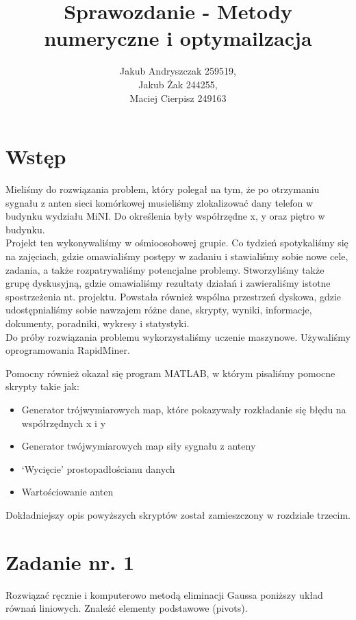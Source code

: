 \documentclass{article}
\begin{document}
\title{Sprawozdanie - Metody numeryczne i optymailzacja}
\author{Jakub Andryszczak 259519,\\ Jakub Żak 244255,\\ Maciej Cierpisz 249163}
\date{}
\maketitle
\tableofcontents
\newpage
\section{Wstęp}
Mieliśmy do rozwiązania problem, który polegał na tym, że po otrzymaniu sygnału z anten sieci komórkowej musieliśmy zlokalizować dany telefon w budynku wydziału MiNI. Do określenia były współrzędne x, y oraz piętro w budynku.\\

Projekt ten wykonywaliśmy w ośmioosobowej grupie. Co tydzień spotykaliśmy się na zajęciach, gdzie omawialiśmy postępy w zadaniu i stawialiśmy sobie nowe cele, zadania, a także rozpatrywaliśmy potencjalne problemy. Stworzyliśmy także grupę dyskusyjną, gdzie omawialiśmy rezultaty działań i zawieraliśmy istotne spostrzeżenia nt. projektu. Powstała również wspólna przestrzeń dyskowa, gdzie udostępnialiśmy sobie nawzajem różne dane, skrypty, wyniki, informacje, dokumenty, poradniki, wykresy i statystyki.\\

Do próby rozwiązania problemu wykorzystaliśmy uczenie maszynowe. Używaliśmy oprogramowania RapidMiner.

Pomocny również okazał się program MATLAB, w którym pisaliśmy pomocne skrypty takie jak:\\%
\begin{itemize}
\item Generator trójwymiarowych map, które pokazywały rozkładanie się błędu na współrzędnych x i y
\item Generator twójwymiarowych map siły sygnału z anteny
\item `Wycięcie' prostopadłościanu danych
\item Wartościowanie anten
\end{itemize}
Dokładniejszy opis powyższych skryptów został zamieszczony w rozdziale trzecim. 


\section{Zadanie nr. 1}
Rozwiązać ręcznie i komputerowo metodą eliminacji Gaussa poniższy układ równań
liniowych. Znaleźć elementy podstawowe (pivots).
\end{document}
